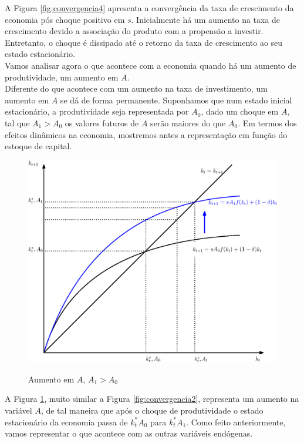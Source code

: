 \documentclass[11pt,a4paper]{article}
\begin{document}
A Figura \ref{fig:convergencia4} apresenta a convergência da taxa de crescimento da economia pós choque positivo em $s$. Inicialmente há um aumento na taxa de crescimento devido a associação do produto com a propensão a investir. Entretanto, o choque é dissipado até o retorno da taxa de crescimento ao seu estado estacionário.\\

Vamos analisar agora o que acontece com a economia quando há um aumento de produtividade, um aumento em $A$.\\

Diferente do que acontece com um aumento na taxa de investimento, um aumento em $A$ se dá de forma permanente. Suponhamos que num estado inicial estacionário, a produtividade seja representada por $A_0$, dado um choque em $A$, tal que $A_1 > A_0$ os valores futuros de $A$ serão maiores do que $A_0$. Em termos dos efeitos dinâmicos na economia, mostremos antes a representação em função do estoque de capital.  

\begin{figure}[!h]
\centering
\caption{Aumento em $A$, $A_1 > A_0$} \vspace{2ex}
\includegraphics[scale=.5]{solow06.eps}
\label{fig:aumentoa}
\end{figure} 
A Figura \ref{fig:aumentoa}, muito similar a Figura \ref{fig:convergencia2}, representa um aumento na variável $A$, de tal maneira que após o choque de produtividade o estado estacionário da economia passa de $k_t ^{\ast}A_0$ para $k_t ^{\ast}A_1$. Como feito anteriormente, vamos representar o que acontece com as outras variáveis endógenas.
\end{document}
